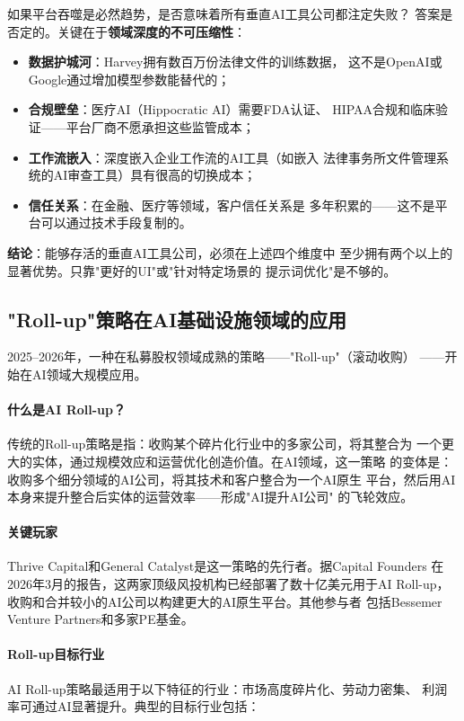 \begin{whybox}[为什么不是所有垂直工具都会被吞噬？]
如果平台吞噬是必然趋势，是否意味着所有垂直AI工具公司都注定失败？
答案是否定的。关键在于\textbf{领域深度的不可压缩性}：
\begin{itemize}
  \item \textbf{数据护城河}：Harvey拥有数百万份法律文件的训练数据，
    这不是OpenAI或Google通过增加模型参数能替代的；
  \item \textbf{合规壁垒}：医疗AI（Hippocratic AI）需要FDA认证、
    HIPAA合规和临床验证——平台厂商不愿承担这些监管成本；
  \item \textbf{工作流嵌入}：深度嵌入企业工作流的AI工具（如嵌入
    法律事务所文件管理系统的AI审查工具）具有很高的切换成本；
  \item \textbf{信任关系}：在金融、医疗等领域，客户信任关系是
    多年积累的——这不是平台可以通过技术手段复制的。
\end{itemize}
\textbf{结论}：能够存活的垂直AI工具公司，必须在上述四个维度中
至少拥有两个以上的显著优势。只靠"更好的UI"或"针对特定场景的
提示词优化"是不够的。
\end{whybox}


\subsection{"Roll-up"策略在AI基础设施领域的应用}
\label{subsec:outlook-rollup}

2025--2026年，一种在私募股权领域成熟的策略——"Roll-up"（滚动收购）
——开始在AI领域大规模应用。

\paragraph{什么是AI Roll-up？}
传统的Roll-up策略是指：收购某个碎片化行业中的多家公司，将其整合为
一个更大的实体，通过规模效应和运营优化创造价值。在AI领域，这一策略
的变体是：收购多个细分领域的AI公司，将其技术和客户整合为一个AI原生
平台，然后用AI本身来提升整合后实体的运营效率——形成"AI提升AI公司"
的飞轮效应。

\paragraph{关键玩家}
Thrive Capital和General Catalyst是这一策略的先行者。据Capital Founders
在2026年3月的报告，这两家顶级风投机构已经部署了数十亿美元用于AI
Roll-up，收购和合并较小的AI公司以构建更大的AI原生平台。其他参与者
包括Bessemer Venture Partners和多家PE基金。

\paragraph{Roll-up目标行业}
AI Roll-up策略最适用于以下特征的行业：市场高度碎片化、劳动力密集、
利润率可通过AI显著提升。典型的目标行业包括：

